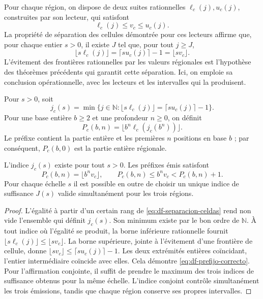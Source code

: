 Pour chaque région, on dispose de deux suites rationnelles
\(\ell_c(j),u_c(j)\), construites par son lecteur, qui satisfont
\[
 \ell_c(j)\leq v_c\leq u_c(j).
\]
La propriété de séparation des cellules démontrée pour ces lecteurs affirme
que, pour chaque entier \(s>0\), il existe \(J\) tel que, pour tout \(j\geq J\),
\begin{equation}
 \lfloor s\ell_c(j)\rfloor
 =\lceil su_c(j)\rceil-1
 =\lfloor sv_c\rfloor.
 \label{eq:df-separacion-celdas}
\end{equation}
L'évitement des frontières rationnelles par les valeurs régionales est l'hypothèse des théorèmes précédents qui garantit cette séparation. Ici, on emploie sa conclusion opérationnelle, avec les lecteurs et les intervalles qui la produisent.

\begin{definition}
Pour \(s>0\), soit
\[
 j_c(s)=\min\{j\in\mathbb N:
 \lfloor s\ell_c(j)\rfloor=\lceil su_c(j)\rceil-1\}.
\]
Pour une base entière \(b\geq2\) et une profondeur \(n\geq0\), on définit
\begin{equation}
 P_c(b,n)=\lfloor b^n\ell_c(j_c(b^n))\rfloor.
 \label{eq:df-publicacion-prefijo}
\end{equation}
Le préfixe contient la partie entière et les premières \(n\) positions en base \(b\) ; par conséquent, \(P_c(b,0)\) est la partie entière régionale.
\end{definition}

\begin{theorem}
\label{thm:df-emision-correcta}
L'indice \(j_c(s)\) existe pour tout \(s>0\). Les préfixes émis satisfont
\begin{equation}
 P_c(b,n)=\lfloor b^n v_c\rfloor,
 \qquad
 P_c(b,n)\leq b^n v_c<P_c(b,n)+1.
 \label{eq:df-prefijo-correcto}
\end{equation}
Pour chaque échelle \(s\) il est possible en outre de choisir un unique indice de suffisance \(J(s)\) valide simultanément pour les trois régions.
\end{theorem}

\begin{proof}
L'égalité à partir d'un certain rang de \eqref{eq:df-separacion-celdas} rend non vide
l'ensemble qui définit \(j_c(s)\). Son minimum existe par le bon ordre de
\(\mathbb N\). À tout indice où l'égalité se produit, la borne
inférieure rationnelle fournit
\(\lfloor s\ell_c(j)\rfloor\leq\lfloor sv_c\rfloor\).
La borne supérieure, jointe à l'évitement d'une frontière de cellule, donne
\(\lfloor sv_c\rfloor\leq\lceil su_c(j)\rceil-1\).
Les deux extrémités entières coïncidant, l'entier intermédiaire coïncide avec
elles. Cela démontre \eqref{eq:df-prefijo-correcto}. Pour l'affirmation
conjointe, il suffit de prendre le maximum des trois indices de suffisance obtenus
pour la même échelle. L'indice conjoint contrôle simultanément les trois
émissions, tandis que chaque région conserve ses propres intervalles.
\end{proof}

